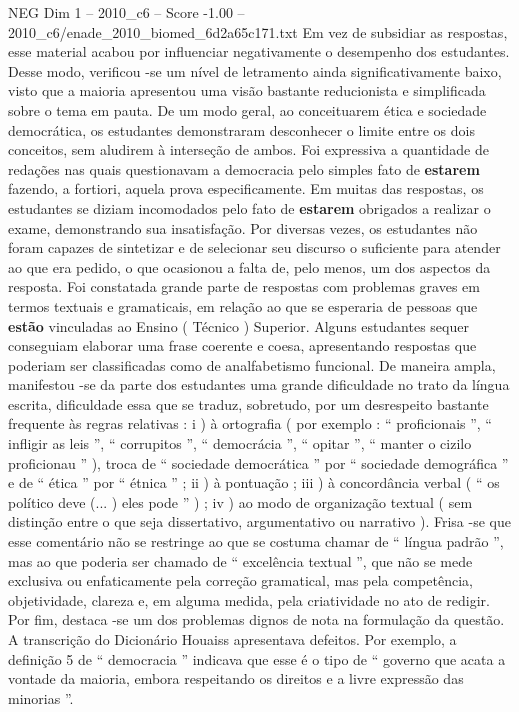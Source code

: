 \begin{textsample}{NEG Dim 1 – 2010\_c6 – Score -1.00 – 2010\_c6/enade\_2010\_biomed\_6d2a65c171.txt}
Em vez de subsidiar as respostas, esse material acabou por influenciar negativamente o desempenho dos estudantes.
Desse modo, verificou -se um nível de letramento ainda significativamente baixo, visto que a maioria apresentou uma visão bastante reducionista e simplificada sobre o tema em pauta.
De um modo geral, ao conceituarem ética e sociedade democrática, os estudantes demonstraram desconhecer o limite entre os dois conceitos, sem aludirem à interseção de ambos.
Foi expressiva a quantidade de redações nas quais questionavam a democracia pelo simples fato de \textbf{estarem} fazendo, a fortiori, aquela prova especificamente.
Em muitas das respostas, os estudantes se diziam incomodados pelo fato de \textbf{estarem} obrigados a realizar o exame, demonstrando sua insatisfação.
Por diversas vezes, os estudantes não foram capazes de sintetizar e de selecionar seu discurso o suficiente para atender ao que era pedido, o que ocasionou a falta de, pelo menos, um dos aspectos da resposta.
Foi constatada grande parte de respostas com problemas graves em termos textuais e gramaticais, em relação ao que se esperaria de pessoas que \textbf{estão} vinculadas ao Ensino ( Técnico ) Superior.
Alguns estudantes sequer conseguiam elaborar uma frase coerente e coesa, apresentando respostas que poderiam ser classificadas como de analfabetismo funcional.
De maneira ampla, manifestou -se da parte dos estudantes uma grande dificuldade no trato da língua escrita, dificuldade essa que se traduz, sobretudo, por um desrespeito bastante frequente às regras relativas : i ) à ortografia ( por exemplo : “ proficionais ”, “ infligir as leis ”, “ corrupitos ”, “ democrácia ”, “ opitar ”, “ manter o cizilo proficionau ” ), troca de “ sociedade democrática ” por “ sociedade demográfica ” e de “ ética ” por “ étnica ” ; ii ) à pontuação ; iii ) à concordância verbal ( “ os político deve (... ) eles pode ” ) ; iv ) ao modo de organização textual ( sem distinção entre o que seja dissertativo, argumentativo ou narrativo ).
Frisa -se que esse comentário não se restringe ao que se costuma chamar de “ língua padrão ”, mas ao que poderia ser chamado de “ excelência textual ”, que não se mede exclusiva ou enfaticamente pela correção gramatical, mas pela competência, objetividade, clareza e, em alguma medida, pela criatividade no ato de redigir.
Por fim, destaca -se um dos problemas dignos de nota na formulação da questão.
A transcrição do Dicionário Houaiss apresentava defeitos.
Por exemplo, a definição 5 de “ democracia ” indicava que esse é o tipo de “ governo que acata a vontade da maioria, embora respeitando os direitos e a livre expressão das minorias ”.

\end{textsample}
